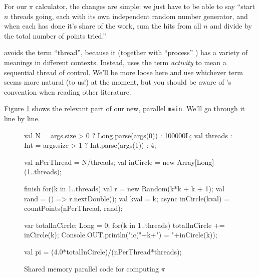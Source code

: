 For our $\pi$ calculator, the changes are simple: we just have to be able to
say ``start $n$ threads going, each with its own independent random number
generator, and when each has done it's share of the work, sum the hits from all
$n$ and divide by the total number of points tried.''  

\Xten{} avoids the term ``thread'', because it (together with ``process'' ) has
a variety of meanings in different contexts.  Instead, \Xten{} uses the term 
{\em activity} to mean a sequential thread of control. We'll be more loose here
and use whichever term seems more natural (to us!) at the moment, but you
should be aware of \Xten's convention when reading other literature.

Figure \ref{fig:mcpm} shows the relevant part of our new, parallel {\tt main}.
We'll go through it line by line.
\begin{figure}[!bthp]
\hrulefill
\begin{xtennum}[]
      val N = args.size > 0 ? Long.parse(args(0)) : 100000L;  
      val threads : Int = args.size > 1 ? Int.parse(args(1)) :  4; 

      val nPerThread = N/threads; 
      val inCircle = new Array[Long](1..threads);   
 
      finish for(k in 1..threads) { 
         val r = new Random(k*k + k + 1);       
         val rand = () => r.nextDouble();       
         val kval = k;                     
         async inCircle(kval) = countPoints(nPerThread, rand); 
      }                                 

      var totalInCircle: Long = 0;             
      for(k in 1..threads) {      
         totalInCircle += inCircle(k);         
         Console.OUT.println("ic("+k+") = "+inCircle(k)); 
      }                                 

      val pi = (4.0*totalInCircle)/(nPerThread*threads); 
\end{xtennum}
\hrulefill
\caption{Shared memory parallel code for computing $\pi$}\label{fig:mcpm}
\end{figure}
